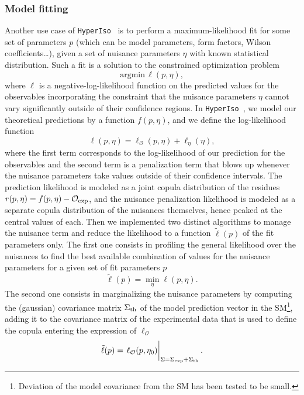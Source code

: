 \documentclass[preprint,11pt]{elsarticle}
\newcommand{\hi}{\texttt{HyperIso}}
\begin{document}
\subsubsection{Model fitting}
Another use case of \hi~ is to perform a maximum-likelihood fit for some set of parameters $p$ (which can be model parameters, form factors, Wilson coefficients\dots), given a set of nuisance parameters $\eta$ with known statistical distribution. Such a fit is a solution to the constrained optimization problem
\begin{equation}
    \mathrm{argmin}\,\ell(p,\eta),
\end{equation}
where $\ell$ is a negative-log-likelihood function on the predicted values for the observables incorporating the constraint that the nuisance parameters $\eta$ cannot vary significantly outside of their confidence regions. In \hi~, we model our theoretical predictions by a function $f(p,\eta)$, and we define the log-likelihood function
\begin{equation}
    \ell(p,\eta)=\ell_{\mathcal O}(p,\eta)+\ell_{\eta}(\eta),
\end{equation}
where the first term corresponds to the log-likelihood of our prediction for the observables and the second term is a penalization term that blows up whenever the nuisance parameters take values outside of their confidence intervals. The prediction likelihood is modeled as a joint copula distribution of the residues $r(p,\eta)=f(p,\eta)-\mathcal{O}_{\rm exp}$, and the nuisance penalization likelihood is modeled as a separate copula distribution of the nuisances themselves, hence peaked at the central values of each. \smallbreak
Then we implemented two distinct algorithms to manage the nuisance term and reduce the likelihood to a function $\tilde\ell(p)$ of the fit parameters only.
The first one consists in profiling the general likelihood over the nuisances to find the best available combination of values for the nuisance parameters for a given set of fit parameters $p$
\begin{equation}
    \tilde\ell(p)=\min_{\eta}\ell(p,\eta).
\end{equation}
The second one consists in marginalizing the nuisance parameters by computing the (gaussian) covariance matrix $\Sigma_{\rm th}$ of the model prediction vector in the SM\footnote{Deviation of the model covariance from the SM has been tested to be small.}, adding it to the covariance matrix of the experimental data that is used to define the copula entering the expression of $\ell_{\mathcal O}$
\begin{equation}
    \tilde\ell(p)=\eval{\ell_{\mathcal{O}}(p,\eta_0)}_{\Sigma=\Sigma_{\rm exp}+\Sigma_{\rm th}}.
\end{equation}
\end{document}
